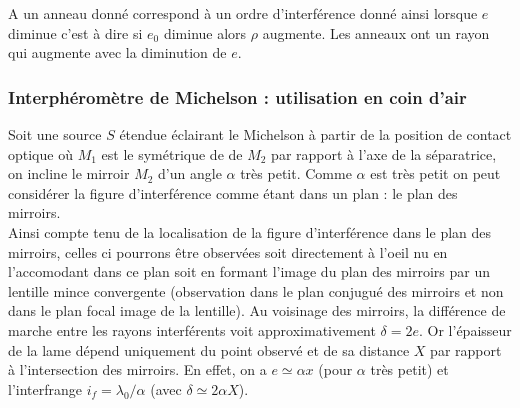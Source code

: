 \documentclass[a4paper,12pt]{article}
\theoremstyle{StyleTheo_will}
\theoremstyle{remark}
\begin{document}
A un anneau donné correspond à un ordre d'interférence donné ainsi lorsque $e$ diminue c'est à dire si $e_0$ diminue alors $\rho$ augmente. Les anneaux ont un rayon qui augmente avec la diminution de $e$.

\subsubsection{Interphéromètre de Michelson : utilisation en coin d'air}

Soit une source $S$ étendue éclairant le Michelson à partir de la position de contact optique où $M_1$ est le symétrique de de $M_2$ par rapport à l'axe de la séparatrice, on incline le mirroir $M_2$ d'un angle $\alpha$ très petit. Comme $\alpha$ est très petit on peut considérer la figure d'interférence comme étant dans un plan : le plan des mirroirs.\\
Ainsi compte tenu de la localisation de la figure d'interférence dans le plan des mirroirs, celles ci pourrons être observées soit directement à l'oeil nu en l'accomodant dans ce plan soit en formant l'image du plan des mirroirs par un lentille mince convergente (observation dans le plan conjugué des mirroirs et non dans le plan focal image de la lentille). Au voisinage des mirroirs, la différence de marche entre les rayons interférents voit approximativement $\delta = 2e$. Or l'épaisseur de la lame dépend uniquement du point observé et de sa distance $X$ par rapport à l'intersection des mirroirs. En effet, on a $e \simeq \alpha x$ (pour $\alpha$ très petit) et l'interfrange $i_f= \lambda_0/\alpha$ (avec $\delta \simeq 2\alpha X$).
\end{document}
